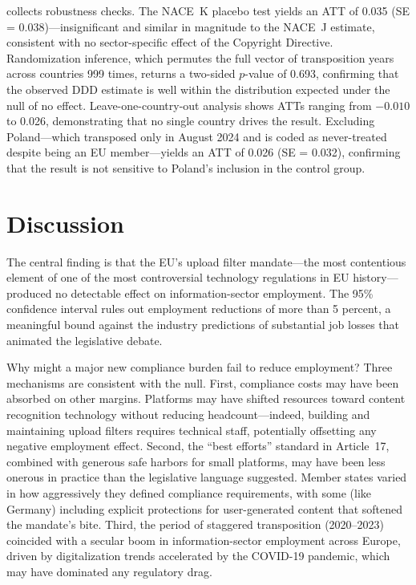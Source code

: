 \documentclass[12pt]{article}
\begin{document}
 collects robustness checks. The NACE~K placebo test yields an ATT of 0.035 (SE = 0.038)---insignificant and similar in magnitude to the NACE~J estimate, consistent with no sector-specific effect of the Copyright Directive. Randomization inference, which permutes the full vector of transposition years across countries 999 times, returns a two-sided $p$-value of 0.693, confirming that the observed DDD estimate is well within the distribution expected under the null of no effect. Leave-one-country-out analysis shows ATTs ranging from $-0.010$ to 0.026, demonstrating that no single country drives the result. Excluding Poland---which transposed only in August 2024 and is coded as never-treated despite being an EU member---yields an ATT of 0.026 (SE = 0.032), confirming that the result is not sensitive to Poland's inclusion in the control group.



\section{Discussion}

The central finding is that the EU's upload filter mandate---the most contentious element of one of the most controversial technology regulations in EU history---produced no detectable effect on information-sector employment. The 95\% confidence interval rules out employment reductions of more than 5 percent, a meaningful bound against the industry predictions of substantial job losses that animated the legislative debate.

Why might a major new compliance burden fail to reduce employment? Three mechanisms are consistent with the null. First, compliance costs may have been absorbed on other margins. Platforms may have shifted resources toward content recognition technology without reducing headcount---indeed, building and maintaining upload filters requires technical staff, potentially offsetting any negative employment effect. Second, the ``best efforts'' standard in Article~17, combined with generous safe harbors for small platforms, may have been less onerous in practice than the legislative language suggested. Member states varied in how aggressively they defined compliance requirements, with some (like Germany) including explicit protections for user-generated content that softened the mandate's bite. Third, the period of staggered transposition (2020--2023) coincided with a secular boom in information-sector employment across Europe, driven by digitalization trends accelerated by the COVID-19 pandemic, which may have dominated any regulatory drag.
\end{document}
